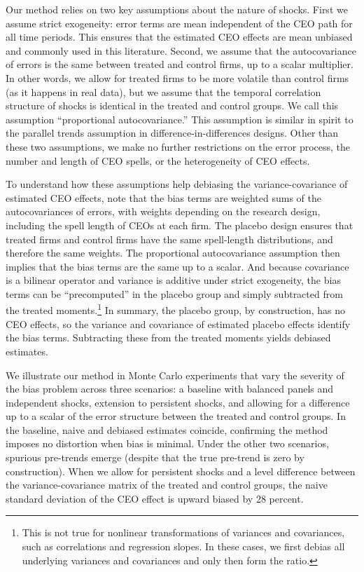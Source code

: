 \documentclass[11pt,a4paper]{article}
\begin{document}
Our method relies on two key assumptions about the nature of shocks. First we assume strict exogeneity: error terms are mean independent of the CEO path for all time periods. This ensures that the estimated CEO effects are mean unbiased and commonly used in this literature. Second, we assume that the autocovariance of errors is the same between treated and control firms, up to a scalar multiplier. In other words, we allow for treated firms to be more volatile than control firms (as it happens in real data), but we assume that the temporal correlation structure of shocks is identical in the treated and control groups. We call this assumption ``proportional autocovariance.'' This assumption is similar in spirit to the parallel trends assumption in difference-in-differences designs. Other than these two assumptions, we make no further restrictions on the error process, the number and length of CEO spells, or the heterogeneity of CEO effects. 

To understand how these assumptions help debiasing the variance-covariance of estimated CEO effects, note that the bias terms are weighted sums of the autocovariances of errors, with weights depending on the research design, including the spell length of CEOs at each firm. The placebo design ensures that treated firms and control firms have the same spell-length distributions, and therefore the same weights. The proportional autocovariance assumption then implies that the bias terms are the same up to a scalar. And because covariance is a bilinear operator and variance is additive under strict exogeneity, the bias terms can be ``precomputed'' in the placebo group and simply subtracted from the treated moments.\footnote{This is not true for nonlinear transformations of variances and covariances, such as correlations and regression slopes. In these cases, we first debias all underlying variances and covariances and only then form the ratio.} In summary, the placebo group, by construction, has no CEO effects, so the variance and covariance of estimated placebo effects identify the bias terms. Subtracting these from the treated moments yields debiased estimates.

We illustrate our method in Monte Carlo experiments that vary the severity of the bias problem across three scenarios: a baseline with balanced panels and independent shocks, extension to persistent shocks, and allowing for a difference up to a scalar of the error structure between the treated and control groups. In the baseline, naive and debiased estimates coincide, confirming the method imposes no distortion when bias is minimal. Under the other two scenarios, spurious pre-trends emerge (despite that the true pre-trend is zero by construction). When we allow for persistent shocks and a level difference between the variance-covariance matrix of the treated and control groups, the naive standard deviation of the CEO effect is upward biased by 28 percent. 
\end{document}
